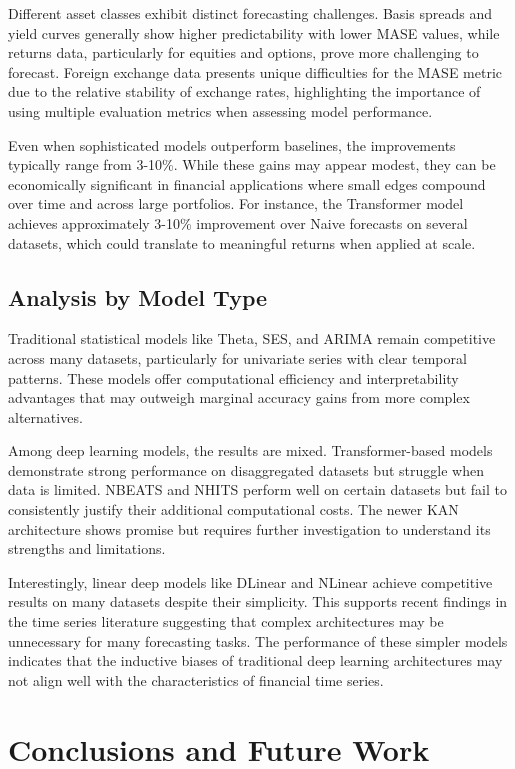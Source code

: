 \documentclass{article}
\begin{document}
Different asset classes exhibit distinct forecasting challenges. Basis spreads and yield curves generally show higher predictability with lower MASE values, while returns data, particularly for equities and options, prove more challenging to forecast. Foreign exchange data presents unique difficulties for the MASE metric due to the relative stability of exchange rates, highlighting the importance of using multiple evaluation metrics when assessing model performance.

Even when sophisticated models outperform baselines, the improvements typically range from 3-10\%. While these gains may appear modest, they can be economically significant in financial applications where small edges compound over time and across large portfolios. For instance, the Transformer model achieves approximately 3-10\% improvement over Naive forecasts on several datasets, which could translate to meaningful returns when applied at scale.

\subsection{Analysis by Model Type}

Traditional statistical models like Theta, SES, and ARIMA remain competitive across many datasets, particularly for univariate series with clear temporal patterns. These models offer computational efficiency and interpretability advantages that may outweigh marginal accuracy gains from more complex alternatives.

Among deep learning models, the results are mixed. Transformer-based models demonstrate strong performance on disaggregated datasets but struggle when data is limited. NBEATS and NHITS perform well on certain datasets but fail to consistently justify their additional computational costs. The newer KAN architecture shows promise but requires further investigation to understand its strengths and limitations.

Interestingly, linear deep models like DLinear and NLinear achieve competitive results on many datasets despite their simplicity. This supports recent findings in the time series literature suggesting that complex architectures may be unnecessary for many forecasting tasks. The performance of these simpler models indicates that the inductive biases of traditional deep learning architectures may not align well with the characteristics of financial time series.

\section{Conclusions and Future Work}
\label{sec:conclusion}
\end{document}

